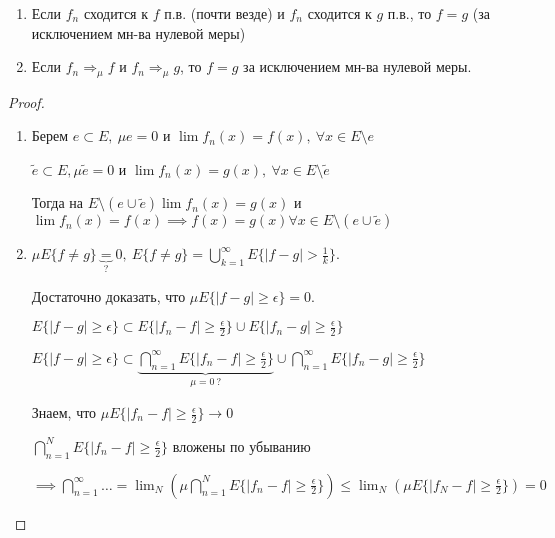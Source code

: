 \begin{statement}
    \begin{enumerate}
        \item {
            Если $f_n$ сходится к $f$ п.в. (почти везде) и $f_n$ сходится к $g$ п.в., то $f = g$ (за исключением мн-ва нулевой меры)
        }
        \item {
            Если $f_n \Rightarrow_{\mu} f$ и $f_n \Rightarrow_{\mu} g$, то $f = g$ за исключением мн-ва нулевой меры.
        }
    \end{enumerate}
\end{statement}
\begin{proof}
    \begin{enumerate}
        \item {
            Берем $e \subset E, \ \mu e = 0$ и $\lim{f_n(x)} = f(x), \ \forall x \in E \setminus e$

            $\tilde{e} \subset E, \mu \tilde{e} = 0$ и $\lim{f_n(x)} = g(x), \ \forall x \in E \setminus \tilde{e}$
        
            Тогда на $E \setminus (e \cup \tilde{e}) \lim f_n(x) = g(x)$ и $\lim f_n(x) = f(x) \implies f(x) = g(x) \forall x \in E \setminus (e \cup \tilde{e})$ 
        }
        \item {
            $\mu E \{ f \not = g \} \underbrace{=}_{?} 0, \ E\{ f \not = g \} = \bigcup_{k=1}^{\infty} E \{ |f - g| > \frac{1}{k} \}$.

            Достаточно доказать, что $\mu E \{ |f - g| \geq \epsilon \} = 0$.

            $E \{ |f - g| \geq \epsilon \} \subset E \{ |f_n - f| \geq \frac{\epsilon}{2} \} \cup E \{ |f_n - g| \geq \frac{\epsilon}{2} \}$


            $E \{ |f - g| \geq \epsilon \} \subset \underbrace{\bigcap_{n=1}^{\infty} E \{ |f_n - f| \geq \frac{\epsilon}{2} \}}_{\mu = 0 \ ?} \cup \bigcap_{n=1}^{\infty} E \{ |f_n - g| \geq \frac{\epsilon}{2} \}$

            Знаем, что $\mu E \{ |f_n - f| \geq \frac{\epsilon}{2} \} \rightarrow 0$

            $\bigcap_{n=1}^{N} E \{ |f_n - f| \geq \frac{\epsilon}{2} \}$ вложены по убыванию

            $\implies \bigcap_{n=1}^{\infty} \dots = \lim_{N} \left( { \mu \bigcap_{n=1}^{N} E \{ |f_n - f| \geq \frac{\epsilon}{2} \} } \right) \leq \lim_{N} \left( {\mu E \{ |f_N - f| \geq \frac{\epsilon}{2} \}}\right) = 0$
        }
    \end{enumerate}
\end{proof}

